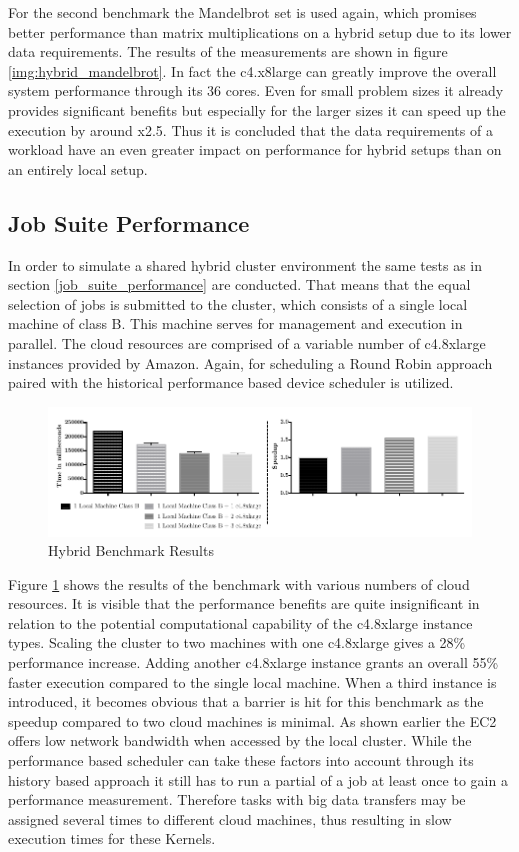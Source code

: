 For the second benchmark the Mandelbrot set is used again, which promises better performance than matrix multiplications on a hybrid setup due to its lower data requirements. The results of the measurements are shown in figure \ref{img:hybrid_mandelbrot}. In fact the c4.x8large can greatly improve the overall system performance through its 36 cores. Even for small problem sizes it already provides significant benefits but especially for the larger sizes it can speed up the execution by around x2.5. Thus it is concluded that the data requirements of a workload have an even greater impact on performance for hybrid setups than on an entirely local setup.

\subsection{Job Suite Performance}

In order to simulate a shared hybrid cluster environment the same tests as in section \ref{job_suite_performance} are conducted. That means that the equal selection of jobs is submitted to the cluster, which consists of a single local machine of class B. This machine serves for management and execution in parallel. The cloud resources are comprised of a variable number of c4.8xlarge instances provided by Amazon. Again, for scheduling a Round Robin approach paired with the historical performance based device scheduler is utilized.

\begin{figure}[H]	
	\includegraphics[width=1.0\textwidth]{images/hybrid_full_benchmark_performance_based.pdf}
	\centering
	\caption{Hybrid Benchmark Results}
	\label{img:hybrid_benchmark_results}
\end{figure}

Figure \ref{img:hybrid_benchmark_results} shows the results of the benchmark with various numbers of cloud resources. It is visible that the performance benefits are quite insignificant in relation to the potential computational capability of the c4.8xlarge instance types. Scaling the cluster to two machines with one c4.8xlarge gives a 28\% performance increase. Adding another c4.8xlarge instance grants an overall 55\% faster execution compared to the single local machine. When a third instance is introduced, it becomes obvious that a barrier is hit for this benchmark as the speedup compared to two cloud machines is minimal. As shown earlier the EC2 offers low network bandwidth when accessed by the local cluster. While the performance based scheduler can take these factors into account through its history based approach it still has to run a partial of a job at least once to gain a performance measurement. Therefore tasks with big data transfers may be assigned several times to different cloud machines, thus resulting in slow execution times for these Kernels. 


